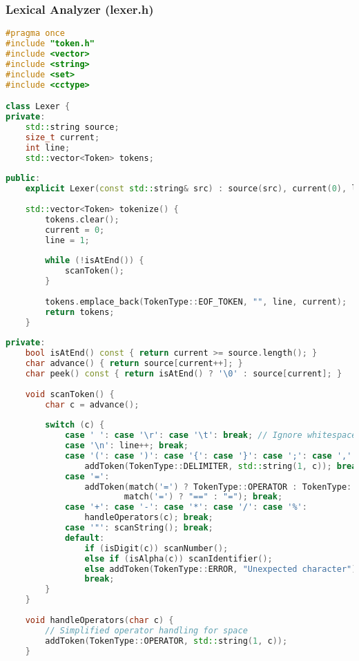 \documentclass[12pt,a4paper]{article}
\begin{document}
\subsubsection{Lexical Analyzer (lexer.h)}

\begin{lstlisting}[language=C++, caption=Lexical Analyzer Implementation (Key Components)]
#pragma once
#include "token.h"
#include <vector>
#include <string>
#include <set>
#include <cctype>

class Lexer {
private:
    std::string source;
    size_t current;
    int line;
    std::vector<Token> tokens;
    
public:
    explicit Lexer(const std::string& src) : source(src), current(0), line(1) {}
    
    std::vector<Token> tokenize() {
        tokens.clear();
        current = 0;
        line = 1;
        
        while (!isAtEnd()) {
            scanToken();
        }
        
        tokens.emplace_back(TokenType::EOF_TOKEN, "", line, current);
        return tokens;
    }
    
private:
    bool isAtEnd() const { return current >= source.length(); }
    char advance() { return source[current++]; }
    char peek() const { return isAtEnd() ? '\0' : source[current]; }
    
    void scanToken() {
        char c = advance();
        
        switch (c) {
            case ' ': case '\r': case '\t': break; // Ignore whitespace
            case '\n': line++; break;
            case '(': case ')': case '{': case '}': case ';': case ',':
                addToken(TokenType::DELIMITER, std::string(1, c)); break;
            case '=':
                addToken(match('=') ? TokenType::OPERATOR : TokenType::ASSIGNMENT, 
                        match('=') ? "==" : "="); break;
            case '+': case '-': case '*': case '/': case '%':
                handleOperators(c); break;
            case '"': scanString(); break;
            default:
                if (isDigit(c)) scanNumber();
                else if (isAlpha(c)) scanIdentifier();
                else addToken(TokenType::ERROR, "Unexpected character");
                break;
        }
    }
    
    void handleOperators(char c) {
        // Simplified operator handling for space
        addToken(TokenType::OPERATOR, std::string(1, c));
    }
    

\end{lstlisting}
\end{document}
